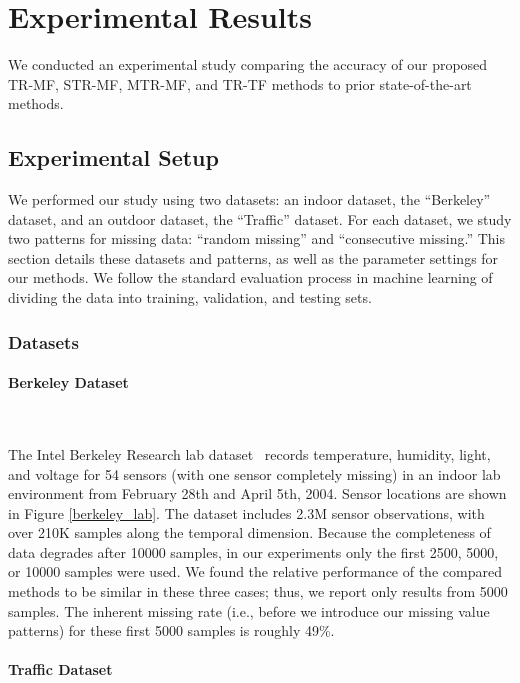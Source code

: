 \section{Experimental Results}  \label{sec:exp}

We conducted an experimental study comparing the accuracy of our proposed TR-MF, STR-MF, MTR-MF, and TR-TF methods to
prior state-of-the-art methods.

\subsection{Experimental Setup}
We performed our study using two datasets: an indoor dataset, the ``Berkeley'' dataset, and an outdoor dataset, the ``Traffic''
dataset.  For each dataset, we study two patterns for missing data: ``random missing'' and ``consecutive missing.''  This section
details these datasets and patterns, as well as the parameter settings for our methods.
We follow the standard evaluation process in machine learning of dividing the data into training, validation, and testing sets.

\subsubsection{Datasets}

\paragraph*{Berkeley Dataset} ~

The Intel Berkeley Research lab dataset~\cite{berkeley2004lab} records temperature, humidity, light, and voltage for 54 sensors (with one sensor completely missing) in an indoor lab environment
from February 28th and April 5th, 2004.  Sensor locations are shown in Figure \ref{berkeley_lab}.
The dataset includes 2.3M sensor observations, with over 210K samples along the temporal dimension.
Because the completeness of data degrades after 10000 samples, in our experiments only the first 2500, 5000, or 10000 samples were used.
We found the relative performance of the compared methods to be similar in these three cases; thus, we report only results from 
5000 samples.  The inherent missing rate (i.e., before we introduce our missing value patterns) for these first 5000 samples is roughly 49\%.


\paragraph*{Traffic Dataset} ~

